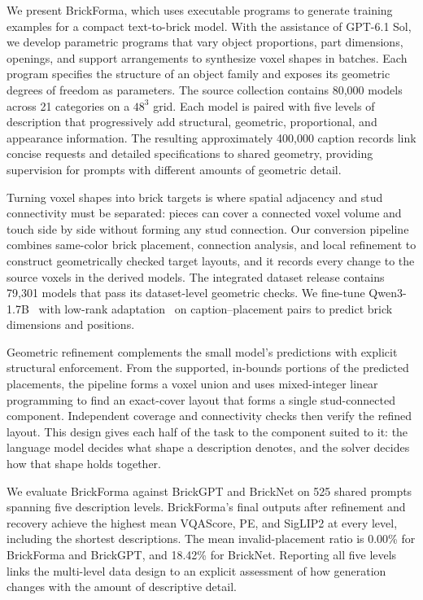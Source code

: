 We present BrickForma, which uses executable programs to generate training examples for a compact text-to-brick model. With the assistance of GPT-6.1 Sol, we develop parametric programs that vary object proportions, part dimensions, openings, and support arrangements to synthesize voxel shapes in batches. Each program specifies the structure of an object family and exposes its geometric degrees of freedom as parameters. The source collection contains 80,000 models across 21 categories on a $48^3$ grid. Each model is paired with five levels of description that progressively add structural, geometric, proportional, and appearance information. The resulting approximately 400,000 caption records link concise requests and detailed specifications to shared geometry, providing supervision for prompts with different amounts of geometric detail.

Turning voxel shapes into brick targets is where spatial adjacency and stud connectivity must be separated: pieces can cover a connected voxel volume and touch side by side without forming any stud connection. Our conversion pipeline combines same-color brick placement, connection analysis, and local refinement to construct geometrically checked target layouts, and it records every change to the source voxels in the derived models. The integrated dataset release contains 79,301 models that pass its dataset-level geometric checks. We fine-tune Qwen3-1.7B~\cite{qwen3} with low-rank adaptation~\cite{lora} on caption--placement pairs to predict brick dimensions and positions.

Geometric refinement complements the small model's predictions with explicit structural enforcement. From the supported, in-bounds portions of the predicted placements, the pipeline forms a voxel union and uses mixed-integer linear programming to find an exact-cover layout that forms a single stud-connected component. Independent coverage and connectivity checks then verify the refined layout. This design gives each half of the task to the component suited to it: the language model decides what shape a description denotes, and the solver decides how that shape holds together.

We evaluate BrickForma against BrickGPT and BrickNet on 525 shared prompts spanning five description levels. BrickForma's final outputs after refinement and recovery achieve the highest mean VQAScore, PE, and SigLIP2 at every level, including the shortest descriptions. The mean invalid-placement ratio is 0.00\% for BrickForma and BrickGPT, and 18.42\% for BrickNet. Reporting all five levels links the multi-level data design to an explicit assessment of how generation changes with the amount of descriptive detail.

